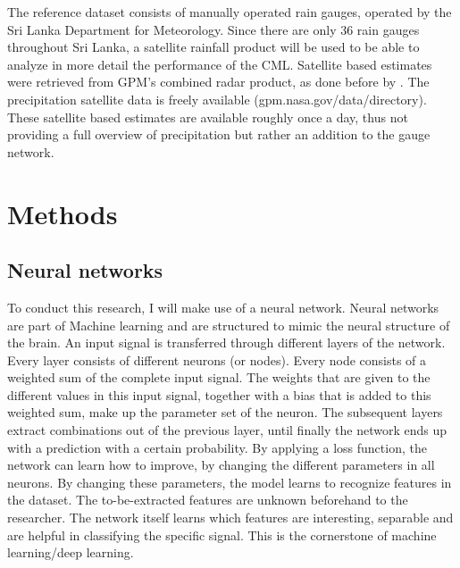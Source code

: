 \documentclass[twocolumn, 10pt, a4paper]{article}
\begin{document}
	The reference dataset consists of manually operated rain gauges, operated by the Sri Lanka Department for Meteorology. Since there are only 36 rain gauges throughout Sri Lanka, a satellite rainfall product will be used to be able to analyze in more detail the performance of the CML. Satellite based estimates were retrieved from GPM's combined radar product, as done before by . The precipitation satellite data is freely available (gpm.nasa.gov/data/directory). These satellite based estimates are available roughly once a day, thus not providing a full overview of precipitation but rather an addition to the gauge network.
	
	\section{Methods}
	\subsection{Neural networks}
	To conduct this research, I will make use of a neural network. Neural networks are part of Machine learning and are structured to mimic the neural structure of the brain. An input signal is transferred through different layers of the network. Every layer consists of different neurons (or nodes). Every node consists of a weighted sum of the complete input signal. The weights that are given to the different values in this input signal, together with a bias that is added to this weighted sum, make up the parameter set of the neuron. 
	The subsequent layers extract combinations out of the previous layer, until finally the network ends up with a prediction with a certain probability. By applying a loss function, the network can learn how to improve, by changing the different parameters in all neurons. By changing these parameters, the model learns to recognize features in the dataset. The to-be-extracted features are unknown beforehand to the researcher. The network itself learns which features are interesting, separable and are helpful in classifying the specific signal. This is the cornerstone of machine learning/deep learning. 
	
\end{document}
